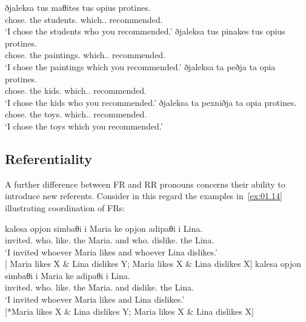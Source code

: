 \documentclass[output=paper]{langsci/langscibook}
\begin{document}
\ea {}\label{ex:01.12}
	\ea
		\gll ðjaleksa tus maθites {tus opius} protines.\\
			chose.\Fsg{} the students.\Acc{} which.\M{}.\Pl{} recommended.\Ssg{}\\
		\glt ‘I chose the students who you recommended.'
	\ex
		\gll ðjaleksa tus pinakes {tus opius} protines.\\
			chose.\Fsg{} the paintings.\Acc{} which.\M{}.\Pl{} recommended.\Ssg{}\\
		\glt \enquote*{I chose the paintings which you recommended.}
	\z
\ex {}\label{ex:01.13}
	\ea
		\gll ðjaleksa ta peðja {ta opia} protines.\\
			chose.\Fsg{} the kids.\Acc{} which.\glossN.\Pl{} recommended.\Ssg{}\\
		\glt ‘I chose the kids who you recommended.'
	\ex
		\gll ðjaleksa ta pexniðja {ta opia} protines.\\
			chose.\Fsg{} the toys.\Acc{} which.\glossN.\Pl{} recommended.\Ssg{}\\
		\glt ‘I chose the toys which you recommended.'
	\z
\z

\subsection{Referentiality}
A further difference between \gls{FR} and
\gls{RR} pronouns concerns their ability to introduce new referents.
Consider in this regard the examples in~\eqref{ex:01.14} illustrating
coordination of \glspl{FR}:

\ea {}\label{ex:01.14}
	\ea
		\gll kalesa opjon simbaθi i Maria ke opjon adipaθi i Lina.\\
			 invited.\Fsg{} who.\Acc{} like.\Tsg{} the Maria.\Nom{} and who.\Acc{} dislike.\Tsg{} the Lina.\Nom{}\\
		\glt \enquote*{I invited whoever Maria likes and whoever Lina dislikes.}\\
            {}[ Maria likes X \& Lina dislikes Y;  Maria likes X \& Lina dislikes X]
	\ex
		\gll kalesa opjon simbaθi i Maria ke adipaθi i Lina.\\
			 invited.\Fsg{} who.\Acc{} like.\Tsg{} the Maria.\Nom{} and dislike.\Tsg{} the Lina.\Nom{}\\
		\glt \enquote*{I invited whoever Maria likes and Lina dislikes.}\\
        {}[*Maria likes X \& Lina dislikes Y;  Maria likes X \& Lina dislikes X]
	\z
\z
\end{document}
